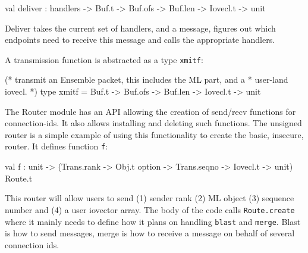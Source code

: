 \begin{codebox}
val deliver : handlers -> Buf.t -> Buf.ofs -> Buf.len -> Iovecl.t -> unit
\end{codebox}

Deliver takes the current set of handlers, and a message, figures out
which endpoints need to receive this message and calls the appropriate
handlers. 

A transmission function is abstracted as a type {\tt xmitf}:
\begin{codebox}
(* transmit an Ensemble packet, this includes the ML part, and a
 * user-land iovecl.
 *)
type xmitf = Buf.t -> Buf.ofs -> Buf.len -> Iovecl.t -> unit
\end{codebox}

The Router module has an API allowing the creation of send/recv
functions for connection-ids. It also allows installing and deleting
such functions. The unsigned router is a simple example of
using this functionality to create the basic, insecure,
router. It defines function {\tt f}: 
\begin{codebox}
val f : unit -> 
  (Trans.rank -> Obj.t option -> Trans.seqno -> Iovecl.t -> unit) Route.t
\end{codebox}

This router will allow users to send (1) sender rank (2) ML object (3)
sequence number and (4) a user iovector array. The body of the code
calls {\tt Route.create} where it mainly needs to define how it plans
on handling {\tt blast} and {\tt merge}. Blast is how to send
messages, merge is how to receive a message on behalf of several
connection ids. 

